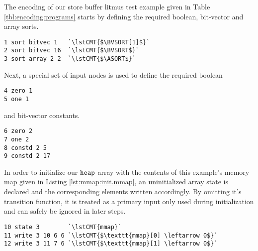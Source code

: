 The encoding of our store buffer litmus test example given in Table \ref{tbl:encoding:programs} starts by defining the required boolean, bit-vector and array sorts.
\begin{lstlisting}[style=btor2]
1 sort bitvec 1   `\lstCMT{$\BVSORT[1]$}`
2 sort bitvec 16  `\lstCMT{$\BVSORT$}`
3 sort array 2 2  `\lstCMT{$\ASORT$}`
\end{lstlisting}
Next, a special set of input nodes is used to define the required boolean
\begin{lstlisting}[style=btor2]
4 zero 1
5 one 1
\end{lstlisting}
and bit-vector constants.
\begin{lstlisting}[style=btor2]
6 zero 2
7 one 2
8 constd 2 5
9 constd 2 17
\end{lstlisting}

\noindent
In order to initialize our $\texttt{heap}$ array with the contents of this example's memory map given in Listing \ref{lst:mmap:init.mmap}, an uninitialized array state is declared and the corresponding elements written accordingly.
By omitting it's transition function, it is treated as a primary input only used during initialization and can safely be ignored in later steps.
\begin{lstlisting}[style=btor2]
10 state 3        `\lstCMT{mmap}`
11 write 3 10 6 6 `\lstCMT{$\texttt{mmap}[0] \leftarrow 0$}`
12 write 3 11 7 6 `\lstCMT{$\texttt{mmap}[1] \leftarrow 0$}`
\end{lstlisting}

